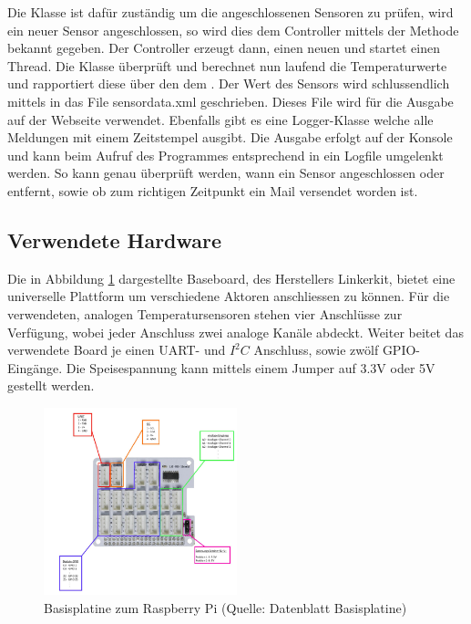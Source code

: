 Die Klasse  ist dafür zuständig um die angeschlossenen Sensoren zu prüfen, wird ein neuer Sensor angeschlossen, so wird dies dem Controller mittels der Methode  bekannt gegeben. Der Controller erzeugt dann, einen neuen  und startet einen Thread. Die Klasse  überprüft und berechnet nun laufend die Temperaturwerte und rapportiert diese über den  dem . Der Wert des Sensors wird schlussendlich mittels  in das File sensordata.xml geschrieben. Dieses File wird für die Ausgabe auf der Webseite verwendet.
Ebenfalls gibt es eine Logger-Klasse welche alle Meldungen mit einem Zeitstempel ausgibt. Die Ausgabe erfolgt auf der Konsole und kann beim Aufruf des Programmes entsprechend in ein Logfile umgelenkt werden. So kann genau überprüft werden, wann ein Sensor angeschlossen oder entfernt, sowie ob zum richtigen Zeitpunkt ein Mail versendet worden ist. 

\subsection{Verwendete Hardware}
Die in Abbildung \ref{fig:plate} dargestellte Baseboard, des Herstellers Linkerkit, bietet eine universelle Plattform um verschiedene Aktoren anschliessen zu können. Für die verwendeten, analogen Temperatursensoren stehen vier Anschlüsse zur Verfügung, wobei jeder Anschluss zwei analoge Kanäle abdeckt. Weiter beitet das verwendete Board je einen UART- und $I^2C$ Anschluss, sowie zwölf GPIO- Eingänge. Die Speisespannung kann mittels einem Jumper auf 3.3V oder 5V gestellt werden.

\begin{figure}[H]%
\centering
\includegraphics[width=0.5\textwidth]{Images/Basisplatine.png}
\caption{Basisplatine zum Raspberry Pi (Quelle: Datenblatt Basisplatine)}
\label{fig:plate}
\end{figure}

